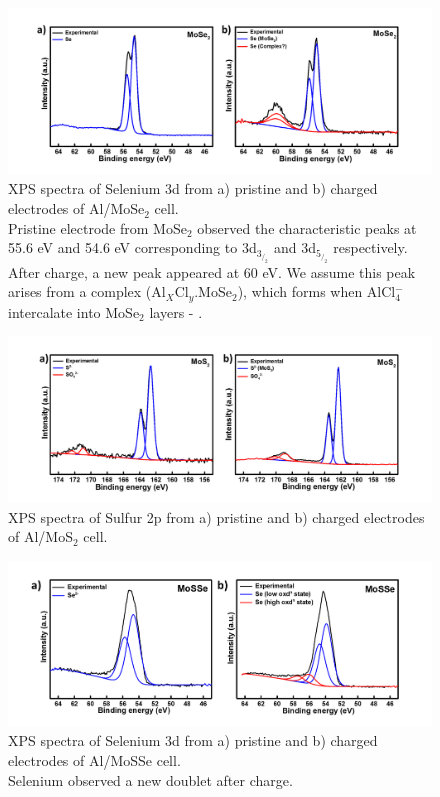 \documentclass[num-refs]{wiley-article}
\begin{document}
\begin{figure}[h]
\centering
\includegraphics[width=\textwidth]{SF/SF4}
\caption{XPS spectra of Selenium 3d from a) pristine and b) charged electrodes of Al/MoSe$_2$ cell. \\Pristine electrode from MoSe$_2$ observed the characteristic peaks at 55.6 eV and 54.6 eV corresponding to 3d$_3_/_2$ and 3d$_5_/_2$ respectively. After charge, a new peak appeared at 60 eV. We assume this peak arises from a complex (Al$_X$Cl$_y$.MoSe$_2$), which forms when AlCl$_4^-$ intercalate into MoSe$_2$ layers - .}
\end{figure}

\begin{figure}[h]
\centering
\includegraphics[width=\textwidth]{SF/SF5}
\caption{XPS spectra of Sulfur 2p from a) pristine and b) charged electrodes of Al/MoS$_2$ cell. }
\end{figure}
\begin{figure}[h]
\centering
\includegraphics[width=\textwidth]{SF/SF6}
\caption{XPS spectra of Selenium 3d from a) pristine and b) charged electrodes of Al/MoSSe cell.\\Selenium observed a new doublet after charge.}
\end{figure}
\pagebreak
\end{document}
